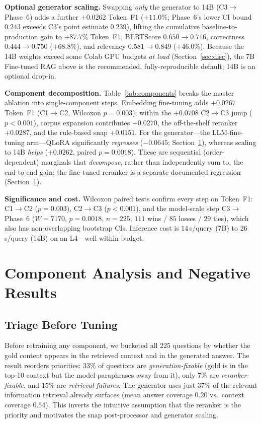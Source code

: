 \documentclass[conference]{IEEEtran}
\newcommand{\best}[1]{\textbf{#1}}
\begin{document}
\textbf{Optional generator scaling.} Swapping \emph{only} the generator to 14B
(C3$\rightarrow$Phase~6) adds a further $+0.0262$ Token~F1 ($+11.0\%$; Phase~6's
lower CI bound $0.243$ exceeds C3's point estimate $0.239$), lifting the
cumulative baseline-to-production gain to \best{$+87.7\%$} Token~F1, BERTScore
$0.650\rightarrow 0.716$, correctness $0.444\rightarrow 0.750$ ($+68.8\%$), and
relevancy $0.581\rightarrow 0.849$ ($+46.0\%$). Because the 14B weights exceed
some Colab GPU budgets \emph{at load} (Section~\ref{sec:disc}), the 7B Fine-tuned
RAG above is the recommended, fully-reproducible default; 14B is an optional
drop-in.

\textbf{Component decomposition.} Table~\ref{tab:components} breaks the master
ablation into single-component steps. Embedding fine-tuning adds $+0.0267$
Token~F1 (C1$\to$C2, Wilcoxon $p{=}0.003$); within the $+0.0708$ C2$\to$C3 jump
($p{<}0.001$), corpus expansion contributes $+0.0270$, the off-the-shelf
reranker $+0.0287$, and the rule-based snap $+0.0151$. For the generator---the
LLM-fine-tuning arm---QLoRA significantly \emph{regresses} ($-0.0645$;
Section~\ref{sec:neg}), whereas scaling to 14B \emph{helps} ($+0.0262$, paired
$p{=}0.0018$). These are sequential (order-dependent) marginals that
\emph{decompose}, rather than independently sum to, the end-to-end gain; the
fine-tuned reranker is a separate documented regression (Section~\ref{sec:neg}).

\textbf{Significance and cost.} Wilcoxon paired tests confirm every step on
Token~F1: C1$\rightarrow$C2 ($p{=}0.003$), C2$\rightarrow$C3 ($p{<}0.001$), and
the model-scale step C3$\rightarrow$Phase~6 ($W{=}7170$, $p{=}0.0018$, $n{=}225$;
$111$ wins / $85$ losses / $29$ ties), which also has non-overlapping bootstrap
CIs. Inference cost is $14$\,s/query (7B) to $26$\,s/query (14B) on an L4---well
within budget.

\section{Component Analysis and Negative Results}
\label{sec:neg}
\subsection{Triage Before Tuning}
\label{sec:triage}
Before retraining any component, we bucketed all $225$ questions by whether the
gold content appears in the retrieved context and in the generated answer. The
result reorders priorities: $33\%$ of questions are
\emph{generation-fixable} (gold is in the top-10 context but the model
paraphrases away from it), only $7\%$ are \emph{reranker-fixable}, and $15\%$
are \emph{retrieval-failures}. The generator uses just $37\%$ of the relevant
information retrieval already surfaces (mean answer coverage $0.20$ vs.\ context
coverage $0.54$). This inverts the intuitive assumption that the reranker is the
priority and motivates the snap post-processor and generator scaling.
\end{document}
